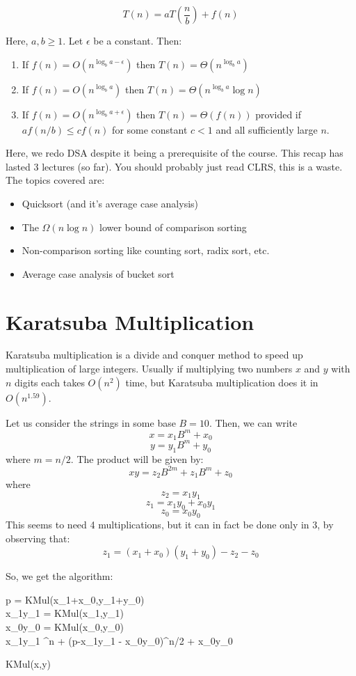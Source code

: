 \documentclass[12pt,letterpaper]{article}
\theoremstyle{definition}
\begin{document}
\[T(n) = aT\left(\frac{n}{b}\right) + f(n)\]

Here, $a, b \geq 1$. Let $\epsilon$ be a constant. Then:

\begin{enumerate}
  \item If $f(n) = O(n^{\log_ba - \epsilon})$ then $T(n) = \Theta(n^{\log_ba})$
  \item If $f(n) = O(n^{\log_ba})$ then $T(n) = \Theta(n^{\log_ba}\log{n})$
  \item If $f(n) = O(n^{\log_ba + \epsilon})$ then $T(n) = \Theta(f(n))$ provided if $af(n/b) \leq cf(n)$ for some constant $c <1$ and all sufficiently large $n$.
\end{enumerate}

Here, we redo DSA despite it being a prerequisite of the course. This recap has lasted 3 lectures (so far). You should probably just read CLRS, this is a waste. The topics covered are:

\begin{itemize}
  \item Quicksort (and it's average case analysis)
  \item The $\Omega(n\log{n})$ lower bound of comparison sorting
  \item Non-comparison sorting like counting sort, radix sort, etc.
  \item Average case analysis of bucket sort
\end{itemize}

\section{Karatsuba Multiplication}

Karatsuba multiplication is a divide and conquer method to speed up multiplication of large integers. Usually if multiplying two numbers $x$ and $y$ with $n$ digits each takes $O(n^2)$ time, but Karatsuba multiplication does it in $O(n^{1.59})$.

Let us consider the strings in some base $B = 10$. Then, we can write
\[x = x_1 B^m + x_0\]
\[y = y_1 B^m + y_0 \]
where $m = n/2$.
The product will be given by:
\[xy = z_2 B^{2m} + z_1 B^m + z_0\]
where 
\[z_2 = x_1y_1\]
\[z_1 = x_1y_0 + x_0y_1\]
\[z_0 = x_0y_0\]
This seems to need 4 multiplications, but it can in fact be done only in 3, by observing that:
\[z_1 = (x_1 + x_0)(y_1 + y_0) - z_2 - z_0\]

So, we get the algorithm:

\begin{algorithm}[H]
  \SetAlgoLined
  p = KMul(x_1+x_0,y_1+y_0) \\
  x_1y_1 = KMul(x_1,y_1) \\ 
  x_0y_0 = KMul(x_0,y_0) \\
  \Return x_1y_1 ^n + (p-x_1y_1 - x_0y_0)^{n/2} + x_0y_0
  \caption{KMul(x,y)}
\end{algorithm}
\end{document}
